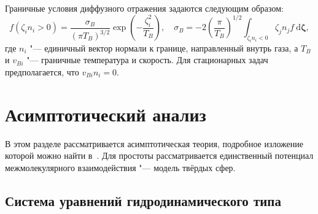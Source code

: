 \documentclass[10pt]{article}
\newcommand{\dd}{\:\mathrm{d}}
\newcommand{\dzeta}{\boldsymbol{\dd\zeta}}
\begin{document}
Граничные условия диффузного отражения задаются следующим образом:
\begin{equation}\label{eq:diffuse_bc}
    f\left(\zeta_i n_i > 0\right) =
        \frac{\sigma_B}{(\pi T_B)^{3/2}} \exp\left(-\frac{\zeta_i^2}{T_B}\right), \quad
    \sigma_B = -2\left(\frac{\pi}{T_B}\right)^{1/2} \int_{\zeta_i n_i < 0} \zeta_j n_j f\dzeta,
\end{equation}
где \(n_i\) "--- единичный вектор нормали к границе, направленный внутрь газа,
а \(T_B\) и \(v_{Bi}\) "--- граничные температура и скорость.
Для стационарных задач предполагается, что \(v_{Bi}n_i = 0\).

\section{Асимптотический анализ}

В этом разделе рассматривается асимптотическая теория,
подробное изложение которой можно найти
в~\cite{Sone1996, Sone2002, Sone2007}.
Для простоты рассматривается единственный потенциал межмолекулярного взаимодействия "---
модель твёрдых сфер.

\subsection{Система уравнений гидродинамического типа}
\end{document}
